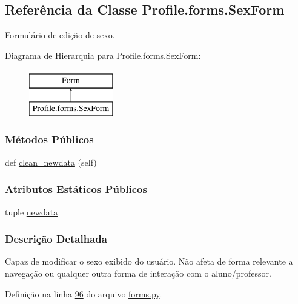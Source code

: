 \hypertarget{classProfile_1_1forms_1_1SexForm}{}\subsection{Referência da Classe Profile.\+forms.\+Sex\+Form}
\label{classProfile_1_1forms_1_1SexForm}


Formulário de edição de sexo.  


Diagrama de Hierarquia para Profile.\+forms.\+Sex\+Form\+:\begin{figure}[H]
\begin{center}
\leavevmode
\includegraphics[height=2.000000cm]{d1/dea/classProfile_1_1forms_1_1SexForm}
\end{center}
\end{figure}
\subsubsection*{Métodos Públicos}
\begin{DoxyCompactItemize}
\item 
def \hyperlink{classProfile_1_1forms_1_1SexForm_ac9ef4da0a6773535d0e94e332d20f9c3}{clean\+\_\+newdata} (self)
\end{DoxyCompactItemize}
\subsubsection*{Atributos Estáticos Públicos}
\begin{DoxyCompactItemize}
\item 
tuple \hyperlink{classProfile_1_1forms_1_1SexForm_a0d99412ab99ee46149a50fabb2614845}{newdata}
\end{DoxyCompactItemize}


\subsubsection{Descrição Detalhada}
Capaz de modificar o sexo exibido do usuário. Não afeta de forma relevante a navegação ou qualquer outra forma de interação com o aluno/professor. 

Definição na linha \hyperlink{Profile_2forms_8py_source_l00096}{96} do arquivo \hyperlink{Profile_2forms_8py_source}{forms.\+py}.



